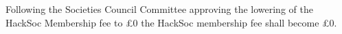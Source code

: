 \begin{subclause}  
  Following the Societies Council Committee approving the lowering of the HackSoc Membership fee to \pounds0 the HackSoc membership fee shall become \pounds0.
\end{subclause}
